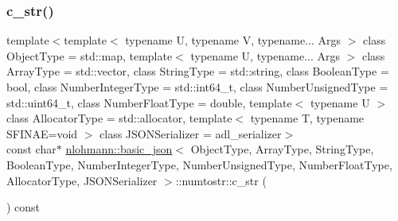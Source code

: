 \subsubsection{\texorpdfstring{c\+\_\+str()}{c\_str()}}
{\footnotesize\ttfamily template$<$template$<$ typename U, typename V, typename... Args $>$ class Object\+Type = std\+::map, template$<$ typename U, typename... Args $>$ class Array\+Type = std\+::vector, class String\+Type  = std\+::string, class Boolean\+Type  = bool, class Number\+Integer\+Type  = std\+::int64\+\_\+t, class Number\+Unsigned\+Type  = std\+::uint64\+\_\+t, class Number\+Float\+Type  = double, template$<$ typename U $>$ class Allocator\+Type = std\+::allocator, template$<$ typename T, typename S\+F\+I\+N\+A\+E=void $>$ class J\+S\+O\+N\+Serializer = adl\+\_\+serializer$>$ \\
const char$\ast$ \hyperlink{classnlohmann_1_1basic__json}{nlohmann\+::basic\+\_\+json}$<$ Object\+Type, Array\+Type, String\+Type, Boolean\+Type, Number\+Integer\+Type, Number\+Unsigned\+Type, Number\+Float\+Type, Allocator\+Type, J\+S\+O\+N\+Serializer $>$\+::numtostr\+::c\+\_\+str (\begin{DoxyParamCaption}{ }\end{DoxyParamCaption}) const\hspace{0.3cm}{\ttfamily [inline]}}

\mbox{\label{structnlohmann_1_1basic__json_1_1numtostr_aadc027c4daff6c4a9fd51a58ff16e53c}} 
